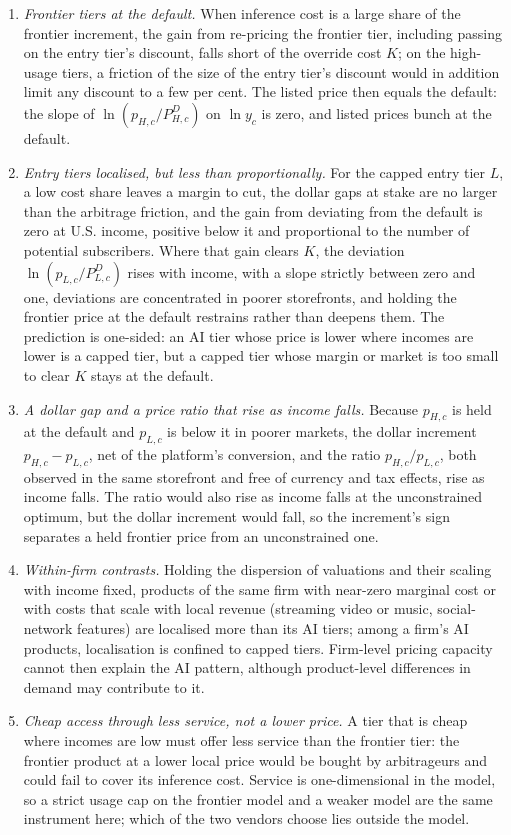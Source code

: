 \documentclass[11pt]{article}
\theoremstyle{definition}
\theoremstyle{remark}
\begin{document}
\begin{enumerate}[label=(P\arabic*),leftmargin=*]
\item \emph{Frontier tiers at the default.} When inference cost is a large share of the frontier increment, the gain from re-pricing the frontier tier, including passing on the entry tier's discount, falls short of the override cost $K$; on the high-usage tiers, a friction of the size of the entry tier's discount would in addition limit any discount to a few per cent. The listed price then equals the default: the slope of $\ln(p_{H,c}/P^D_{H,c})$ on $\ln y_c$ is zero, and listed prices bunch at the default.
\item \emph{Entry tiers localised, but less than proportionally.} For the capped entry tier $L$, a low cost share leaves a margin to cut, the dollar gaps at stake are no larger than the arbitrage friction, and the gain from deviating from the default is zero at U.S. income, positive below it and proportional to the number of potential subscribers. Where that gain clears $K$, the deviation $\ln(p_{L,c}/P^D_{L,c})$ rises with income, with a slope strictly between zero and one, deviations are concentrated in poorer storefronts, and holding the frontier price at the default restrains rather than deepens them. The prediction is one-sided: an AI tier whose price is lower where incomes are lower is a capped tier, but a capped tier whose margin or market is too small to clear $K$ stays at the default.
\item \emph{A dollar gap and a price ratio that rise as income falls.} Because $p_{H,c}$ is held at the default and $p_{L,c}$ is below it in poorer markets, the dollar increment $p_{H,c}-p_{L,c}$, net of the platform's conversion, and the ratio $p_{H,c}/p_{L,c}$, both observed in the same storefront and free of currency and tax effects, rise as income falls. The ratio would also rise as income falls at the unconstrained optimum, but the dollar increment would fall, so the increment's sign separates a held frontier price from an unconstrained one.
\item \emph{Within-firm contrasts.} Holding the dispersion of valuations and their scaling with income fixed, products of the same firm with near-zero marginal cost or with costs that scale with local revenue (streaming video or music, social-network features) are localised more than its AI tiers; among a firm's AI products, localisation is confined to capped tiers. Firm-level pricing capacity cannot then explain the AI pattern, although product-level differences in demand may contribute to it.
\item \emph{Cheap access through less service, not a lower price.} A tier that is cheap where incomes are low must offer less service than the frontier tier: the frontier product at a lower local price would be bought by arbitrageurs and could fail to cover its inference cost. Service is one-dimensional in the model, so a strict usage cap on the frontier model and a weaker model are the same instrument here; which of the two vendors choose lies outside the model.
\end{enumerate}
\end{document}
